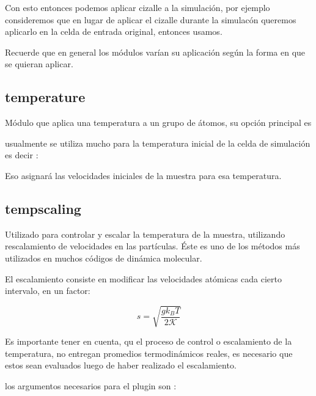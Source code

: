Con esto entonces podemos aplicar cizalle a la simulaci\'on, por ejemplo consideremos que en lugar de aplicar el cizalle durante la simulac\'on queremos aplicarlo en la celda de entrada original, entonces usamos.


Recuerde que en general los m\'odulos var\'ian su aplicaci\'on seg\'un la forma en que se quieran aplicar.


\subsection{temperature}
M\'odulo que aplica una temperatura a un grupo de \'atomos, su opci\'on principal es


usualmente se utiliza mucho para la temperatura inicial de la celda de simulaci\'on es decir :


Eso asignar\'a las velocidades iniciales de la muestra para esa temperatura.

\subsection{tempscaling}

Utilizado para controlar y escalar la temperatura de la muestra, utilizando rescalamiento de velocidades en las part\'iculas. \'Este es uno de los m\'etodos m\'as utilizados en muchos c\'odigos de din\'amica molecular.

El escalamiento consiste en modificar las velocidades at\'omicas cada cierto intervalo, en un factor:

$$s=\sqrt{\frac{gk_BT}{2\mathcal{K}}}$$

Es importante tener en cuenta, qu el proceso de control o escalamiento de la temperatura, no entregan promedios termodin\'amicos reales, es necesario que estos sean evaluados luego de haber realizado el escalamiento.

los argumentos necesarios para el plugin son :



